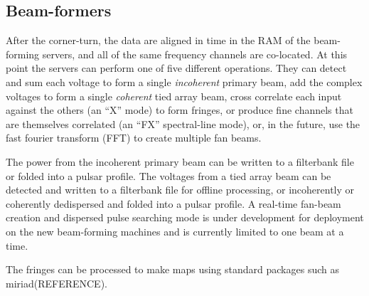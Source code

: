 \subsection{Beam-formers}

After the corner-turn, the data are aligned in time in the RAM of the beam-forming servers, and all of the same frequency channels are co-located. At this point the servers can perform one of five different operations. They can detect and sum each voltage to form a single \textit{incoherent} primary beam, add the complex voltages to form a single \textit{coherent} tied array beam, cross correlate each input against the others (an ``X'' mode) to form fringes, or produce fine channels that are themselves correlated (an ``FX'' spectral-line mode), or, in the future, use the fast fourier transform (FFT) to create multiple fan beams. 

The power from the incoherent primary beam can be written to a filterbank file or folded into a pulsar profile. The voltages from a tied array beam can be detected and written to a filterbank file for offline processing, or incoherently or coherently dedispersed and folded into a pulsar profile. A real-time fan-beam creation and dispersed pulse searching mode is under development for deployment on the new beam-forming machines and is currently limited to one beam at a time.

The fringes can be processed to make maps using standard packages such as miriad(REFERENCE).